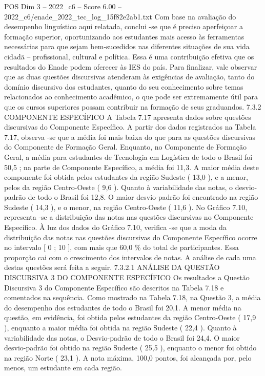 \begin{textsample}{POS Dim 3 – 2022\_c6 – Score 6.00 – 2022\_c6/enade\_2022\_tec\_log\_15f82e2ab1.txt}
Com base na avaliação do desempenho linguístico aqui relatada, conclui -se que é preciso aperfeiçoar a formação superior, oportunizando aos estudantes mais acesso às ferramentas necessárias para que sejam bem-sucedidos nas diferentes situações de sua vida cidadã – profissional, cultural e política.
Essa é uma contribuição efetiva que os resultados do Enade podem oferecer às IES do país.
Para finalizar, vale observar que as duas questões discursivas atenderam às exigências de avaliação, tanto do domínio discursivo dos estudantes, quanto do seu conhecimento sobre temas relacionados ao conhecimento acadêmico, o que pode ser extremamente útil para que os cursos superiores possam contribuir na formação de seus graduandos. 7.3.2 COMPONENTE ESPECÍFICO A Tabela 7.17 apresenta dados sobre questões discursivas do Componente Específico.
A partir dos dados registrados na Tabela 7.17, observa -se que a média foi mais baixa do que para as questões discursivas do Componente de Formação Geral.
Enquanto, no Componente de Formação Geral, a média para estudantes de Tecnologia em Logística de todo o Brasil foi 50,5 ; na parte de Componente Específico, a média foi 11,3.
A maior média deste componente foi obtida pelos estudantes da região Sudeste ( 13,0 ), e a menor, pelos da região Centro-Oeste ( 9,6 ).
Quanto à variabilidade das notas, o desvio-padrão de todo o Brasil foi 12,8.
O maior desvio-padrão foi encontrado na região Sudeste ( 14,3 ), e o menor, na região Centro-Oeste ( 11,6 ).
No Gráfico 7.10, representa -se a distribuição das notas nas questões discursivas no Componente Específico.
À luz dos dados do Gráfico 7.10, verifica -se que a moda da distribuição das notas nas questões discursivas do Componente Específico ocorre no intervalo [ 0 ; 10 ], com mais que 60,0 \% do total de participantes.
Essa proporção cai com o crescimento dos intervalos de notas.
A análise de cada uma destas questões será feita a seguir. 7.3.2.1 ANÁLISE DA QUESTÃO DISCURSIVA 3 DO COMPONENTE ESPECÍFICO Os resultados a Questão Discursiva 3 do Componente Específico são descritos na Tabela 7.18 e comentados na sequência.
Como mostrado na Tabela 7.18, na Questão 3, a média do desempenho dos estudantes de todo o Brasil foi 20,1.
A menor média na questão, em evidência, foi obtida pelos estudantes da região Centro-Oeste ( 17,9 ), enquanto a maior média foi obtida na região Sudeste ( 22,4 ).
Quanto à variabilidade das notas, o Desvio-padrão de todo o Brasil foi 24,4.
O maior desvio-padrão foi obtido na região Sudeste ( 25,5 ), enquanto o menor foi obtido na região Norte ( 23,1 ).
A nota máxima, 100,0 pontos, foi alcançada por, pelo menos, um estudante em cada região.

\end{textsample}

